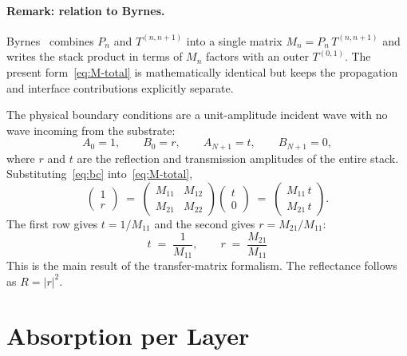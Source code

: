 \documentclass[aps,prb,onecolumn,superscriptaddress,nofootinbib,11pt]{revtex4-2}
\begin{document}
\paragraph{Remark: relation to Byrnes.}
Byrnes~\cite[Eq.~(11)]{Byrnes2020} combines $P_n$ and $T^{(n,n+1)}$ into a single matrix $M_n = P_n\, T^{(n,n+1)}$ and writes the stack product in terms of $M_n$ factors with an outer $T^{(0,1)}$. The present form~\eqref{eq:M-total} is mathematically identical but keeps the propagation and interface contributions explicitly separate.

The physical boundary conditions are a unit-amplitude incident wave with no wave incoming from the substrate:
\begin{equation}
  A_0 = 1, \qquad B_0 = r,
  \qquad
  A_{N+1} = t, \qquad B_{N+1} = 0,
  \label{eq:bc}
\end{equation}
where $r$ and $t$ are the reflection and transmission amplitudes of the entire stack. Substituting~\eqref{eq:bc} into~\eqref{eq:M-total},
\begin{equation}
  \begin{pmatrix} 1 \\ r
  \end{pmatrix}
  \;=\;
  \begin{pmatrix}
    M_{11} & M_{12} \\
    M_{21} & M_{22}
  \end{pmatrix}
  \begin{pmatrix} t \\ 0
  \end{pmatrix}
  \;=\;
  \begin{pmatrix} M_{11}\, t \\ M_{21}\, t
  \end{pmatrix}.
\end{equation}
The first row gives $t = 1/M_{11}$ and the second gives $r = M_{21}/M_{11}$:
\begin{equation}
  \boxed{\;
    t \;=\; \frac{1}{M_{11}},
    \qquad
    r \;=\; \frac{M_{21}}{M_{11}}
  \;}
  \label{eq:r-t-from-M}
\end{equation}
This is the main result of the transfer-matrix formalism. The reflectance follows as $R = |r|^2$.

\section{Absorption per Layer}
\label{sec:absorption-per-layer}
\end{document}
